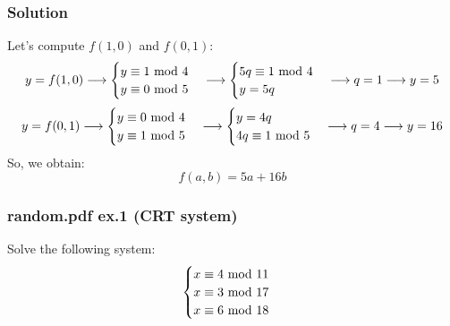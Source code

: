 \subsubsection*{Solution}
Let's compute $f(1,0)$ and $f(0,1)$:
\begin{equation*}
    y=f(1,0)\longrightarrow
    \begin{cases}
        y\equiv1\text{ mod }4\\
        y\equiv0\text{ mod }5
    \end{cases}
    \longrightarrow
    \begin{cases}
        5q\equiv1\text{ mod }4\\
        y=5q
    \end{cases}
    \longrightarrow q=1\longrightarrow y=5
\end{equation*}
\begin{equation*}
    y=f(0,1)\longrightarrow
    \begin{cases}
        y\equiv0\text{ mod }4\\
        y\equiv1\text{ mod }5
    \end{cases}
    \longrightarrow
    \begin{cases}
        y=4q\\
        4q\equiv1\text{ mod }5
    \end{cases}
    \longrightarrow q=4\longrightarrow y=16
\end{equation*}
So, we obtain:
$$f(a,b)=5a+16b$$

\newpage
\subsubsection{random.pdf ex.1 (CRT system)}
Solve the following system:
\begin{equation*}
    \begin{cases}
        x\equiv4\text{ mod }11\\
        x\equiv3\text{ mod }17\\
        x\equiv6\text{ mod }18
    \end{cases}
\end{equation*}
